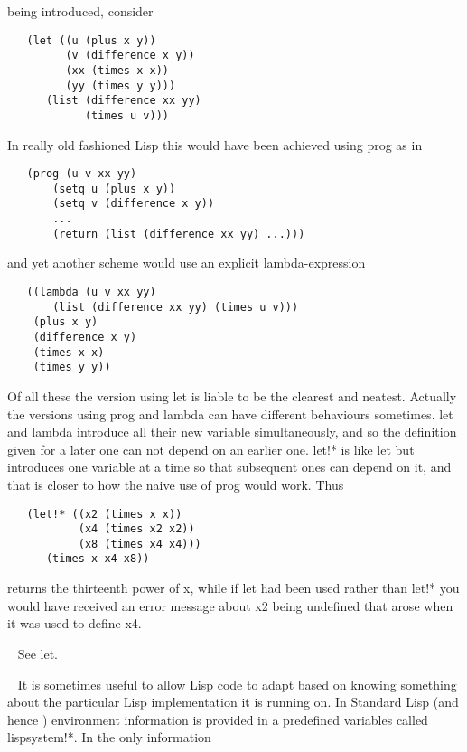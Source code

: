 \begin{description}
being introduced, consider
{\small\begin{verbatim}
   (let ((u (plus x y))
         (v (difference x y))
         (xx (times x x))
         (yy (times y y)))
      (list (difference xx yy)
            (times u v)))
\end{verbatim}}
In really old fashioned Lisp this would have been achieved using {\tx prog}
as in
{\small\begin{verbatim}
   (prog (u v xx yy)
       (setq u (plus x y))
       (setq v (difference x y))
       ...
       (return (list (difference xx yy) ...)))
\end{verbatim}}
\noindent and yet another scheme would use an explicit lambda-expression
{\small\begin{verbatim}
   ((lambda (u v xx yy)
       (list (difference xx yy) (times u v)))
    (plus x y)
    (difference x y)
    (times x x)
    (times y y))
\end{verbatim}}
Of all these the version using {\tx let} is liable to be the clearest and
neatest. Actually the versions using {\tx prog} and {\tx lambda} can
have different behaviours sometimes. {\tx let}
and {\tx lambda} introduce all their new variable simultaneously, and so the
definition given for a later one can not depend on an earlier one. {\tx let!*}
is like {\tx let} but introduces one variable at a time so that subsequent
ones can depend on it, and that is closer to how the naive use of {\tx prog}
would work. Thus
{\small\begin{verbatim}
   (let!* ((x2 (times x x))
           (x4 (times x2 x2))
           (x8 (times x4 x4)))
      (times x x4 x8))
\end{verbatim}}
\noindent returns the thirteenth power of {\tx x}, while if {\tx let} had
been used rather than {\tx let!*} you would have received an error message
about {\tx x2} being undefined that arose when it was used to define {\tx x4}.
\item[{\tx let!*~~~~~~~~} \hspace{1cm} {\em macro}]~\newline
See {\tx let}.
\item[{\tx lispsystem!*~} \hspace{1cm} {\em predefined variable}]~\newline
It is sometimes useful to allow Lisp code to adapt based on knowing
something about the particular Lisp implementation it is running on. In
Standard Lisp (and hence \vsl) environment information is provided in
a predefined variables called {\tx lispsystem!*}. In \vsl{} the only information

\end{description}
